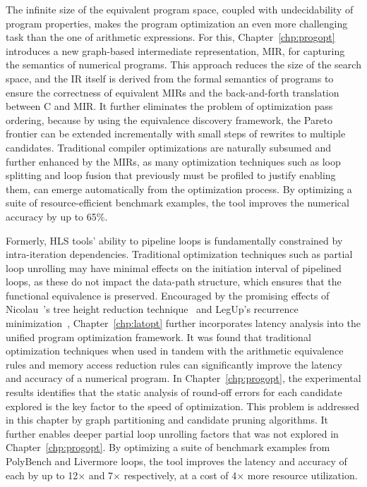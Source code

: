 The infinite size of the equivalent program space, coupled with undecidability
of program properties, makes the program optimization an even more
challenging task than the one of arithmetic expressions.  For this,
Chapter~\ref{chp:progopt} introduces a new graph-based intermediate
representation, MIR, for capturing the semantics of numerical programs.  This
approach reduces the size of the search space, and the IR itself is derived
from the formal semantics of programs to ensure the correctness of equivalent
MIRs and the back-and-forth translation between C and MIR\@.  It further
eliminates the problem of optimization pass ordering, because by using
the equivalence discovery framework, the Pareto frontier can be extended
incrementally with small steps of rewrites to multiple candidates.  Traditional
compiler optimizations are naturally subsumed and further enhanced by the MIRs,
as many optimization techniques such as loop splitting and loop fusion that
previously must be profiled to justify enabling them, can emerge automatically
from the optimization process.  By optimizing a suite of resource-efficient
benchmark examples, the tool improves the numerical accuracy by up to 65\%.

Formerly, HLS tools' ability to pipeline loops is fundamentally constrained
by intra-iteration dependencies.  Traditional optimization techniques such as
partial loop unrolling may have minimal effects on the initiation interval of
pipelined loops, as these do not impact the data-path structure, which ensures
that the functional equivalence is preserved.  Encouraged by the promising
effects of Nicolau~\etal's tree height reduction technique~\cite{nicolau91}
and LegUp's recurrence minimization~\cite{canis14}, Chapter~\ref{chp:latopt}
further incorporates latency analysis into the unified program optimization
framework.  It was found that traditional optimization techniques when used
in tandem with the arithmetic equivalence rules and memory access reduction
rules can significantly improve the latency and accuracy of a numerical
program.  In Chapter~\ref{chp:progopt}, the experimental results identifies
that the static analysis of round-off errors for each candidate explored is
the key factor to the speed of optimization.  This problem is addressed in
this chapter by graph partitioning and candidate pruning algorithms.  It
further enables deeper partial loop unrolling factors that was not explored in
Chapter~\ref{chp:progopt}.  By optimizing a suite of benchmark examples from
PolyBench and Livermore loops, the tool improves the latency and accuracy of
each by up to 12$\times$ and 7$\times$ respectively, at a cost of 4$\times$
more resource utilization.


